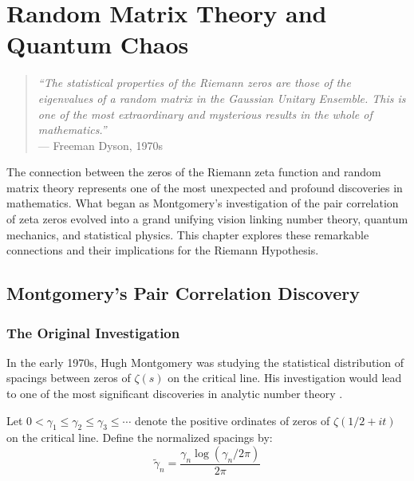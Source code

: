 
\chapter{Random Matrix Theory and Quantum Chaos}
\label{ch:random_matrix}

\begin{quote}
\textit{``The statistical properties of the Riemann zeros are those of the eigenvalues of a random matrix in the Gaussian Unitary Ensemble. This is one of the most extraordinary and mysterious results in the whole of mathematics.''} \\
--- Freeman Dyson, 1970s
\end{quote}

The connection between the zeros of the Riemann zeta function and random matrix theory represents one of the most unexpected and profound discoveries in mathematics. What began as Montgomery's investigation of the pair correlation of zeta zeros evolved into a grand unifying vision linking number theory, quantum mechanics, and statistical physics. This chapter explores these remarkable connections and their implications for the Riemann Hypothesis.

\section{Montgomery's Pair Correlation Discovery}
\label{sec:montgomery_pair_correlation}

\subsection{The Original Investigation}

In the early 1970s, Hugh Montgomery was studying the statistical distribution of spacings between zeros of $\zeta(s)$ on the critical line. His investigation would lead to one of the most significant discoveries in analytic number theory \cite{montgomery1973}.

\begin{definition}
\label{def:normalized_spacings}
Let $0 < \gamma_1 \leq \gamma_2 \leq \gamma_3 \leq \cdots$ denote the positive ordinates of zeros of $\zeta(1/2 + it)$ on the critical line. Define the normalized spacings by:
\begin{equation}
\tilde{\gamma}_n = \frac{\gamma_n \log(\gamma_n/2\pi)}{2\pi}
\label{eq:normalized_spacings}
\end{equation}
\end{definition}

